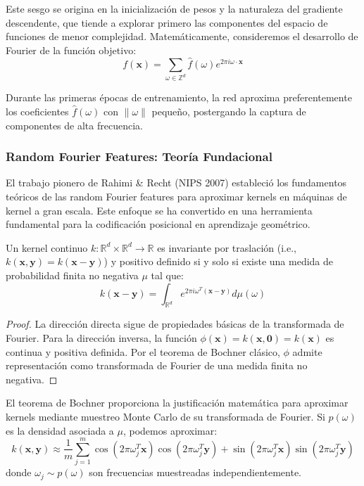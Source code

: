 Este sesgo se origina en la inicialización de pesos y la naturaleza del gradiente descendente, que tiende a explorar primero las componentes del espacio de funciones de menor complejidad. Matemáticamente, consideremos el desarrollo de Fourier de la función objetivo:
\begin{equation}
f(\mathbf{x}) = \sum_{\omega \in \mathbb{Z}^d} \hat{f}(\omega) e^{2\pi i \omega \cdot \mathbf{x}}
\end{equation}

Durante las primeras épocas de entrenamiento, la red aproxima preferentemente los coeficientes $\hat{f}(\omega)$ con $\|\omega\|$ pequeño, postergando la captura de componentes de alta frecuencia.

\subsubsection{Random Fourier Features: Teoría Fundacional}

El trabajo pionero de Rahimi \& Recht (NIPS 2007) estableció los fundamentos teóricos de las random Fourier features para aproximar kernels en máquinas de kernel a gran escala. Este enfoque se ha convertido en una herramienta fundamental para la codificación posicional en aprendizaje geométrico.

\begin{theorem}\label{thm:bochner}
Un kernel continuo $k: \mathbb{R}^d \times \mathbb{R}^d \to \mathbb{R}$ es invariante por traslación (i.e., $k(\mathbf{x}, \mathbf{y}) = k(\mathbf{x} - \mathbf{y})$) y positivo definido si y solo si existe una medida de probabilidad finita no negativa $\mu$ tal que:
\begin{equation}
k(\mathbf{x} - \mathbf{y}) = \int_{\mathbb{R}^d} e^{2\pi i \omega^T (\mathbf{x} - \mathbf{y})} d\mu(\omega)
\end{equation}
\end{theorem}

\begin{proof}
La dirección directa sigue de propiedades básicas de la transformada de Fourier. Para la dirección inversa, la función $\phi(\mathbf{x}) = k(\mathbf{x}, \mathbf{0}) = k(\mathbf{x})$ es continua y positiva definida. Por el teorema de Bochner clásico, $\phi$ admite representación como transformada de Fourier de una medida finita no negativa.
\end{proof}

El teorema de Bochner proporciona la justificación matemática para aproximar kernels mediante muestreo Monte Carlo de su transformada de Fourier. Si $p(\omega)$ es la densidad asociada a $\mu$, podemos aproximar:
\begin{equation}
k(\mathbf{x}, \mathbf{y}) \approx \frac{1}{m} \sum_{j=1}^m \cos(2\pi \omega_j^T \mathbf{x}) \cos(2\pi \omega_j^T \mathbf{y}) + \sin(2\pi \omega_j^T \mathbf{x}) \sin(2\pi \omega_j^T \mathbf{y})
\end{equation}
donde $\omega_j \sim p(\omega)$ son frecuencias muestreadas independientemente.

